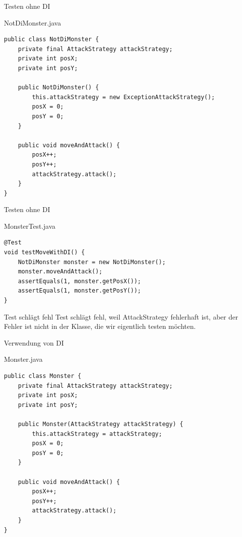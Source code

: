 \begin{frame}[fragile]{Testen ohne DI}
	\begin{exampleblock}{NotDiMonster.java}
		\begin{lstlisting}
public class NotDiMonster {
	private final AttackStrategy attackStrategy;
	private int posX;
	private int posY;
	
	public NotDiMonster() {
		this.attackStrategy = new ExceptionAttackStrategy();
		posX = 0;
		posY = 0;
	}
	
	public void moveAndAttack() {
		posX++;
		posY++;
		attackStrategy.attack();
	}
}
		\end{lstlisting}
	\end{exampleblock}
\end{frame}

\begin{frame}[fragile]{Testen ohne DI}
	\begin{exampleblock}{MonsterTest.java}
		\begin{lstlisting}
@Test
void testMoveWithDI() {
	NotDiMonster monster = new NotDiMonster();
	monster.moveAndAttack();
	assertEquals(1, monster.getPosX());
	assertEquals(1, monster.getPosY());
}
		\end{lstlisting}
	\end{exampleblock}
	\pause
	\begin{alertblock}{Test schlägt fehl}
		Test schlägt fehl, weil AttackStrategy fehlerhaft ist, aber der Fehler
		ist nicht in der Klasse, die wir eigentlich testen möchten.
	\end{alertblock}
\end{frame}

\begin{frame}[fragile]{Verwendung von DI}
	\begin{exampleblock}{Monster.java}
		\begin{lstlisting}
public class Monster {
	private final AttackStrategy attackStrategy;
	private int posX;
	private int posY;
	
	public Monster(AttackStrategy attackStrategy) {
		this.attackStrategy = attackStrategy;
		posX = 0;
		posY = 0;
	}
	
	public void moveAndAttack() {
		posX++;
		posY++;
		attackStrategy.attack();
	}
}
		\end{lstlisting}
	\end{exampleblock}
\end{frame}

